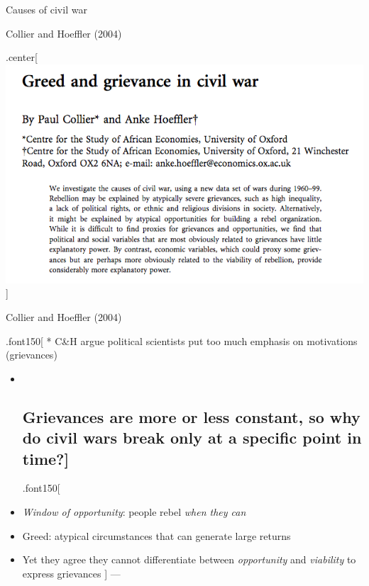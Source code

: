 \documentclass[ignorenonframetext,]{beamer}
\begin{document}
\begin{frame}{Causes of civil war}

\end{frame}

\begin{frame}{Collier and Hoeffler (2004)}

.center{[}\includegraphics{ch00.png}{]}

\end{frame}

\begin{frame}{Collier and Hoeffler (2004)}

.font150{[} * C\&H argue political scientists put too much emphasis on
motivations (grievances)

\begin{itemize}
\item ~
  \subsection{Grievances are more or less constant, so why do civil wars
  break only at a specific point in
  time?{]}}\label{grievances-are-more-or-less-constant-so-why-do-civil-wars-break-only-at-a-specific-point-in-time}

  .font150{[}
\item
  \emph{Window of opportunity}: people rebel \emph{when they can}
\item
  Greed: atypical circumstances that can generate large returns
\item
  Yet they agree they cannot differentiate between \emph{opportunity}
  and \emph{viability} to express grievances {]} ---
\end{itemize}

\end{frame}
\end{document}
